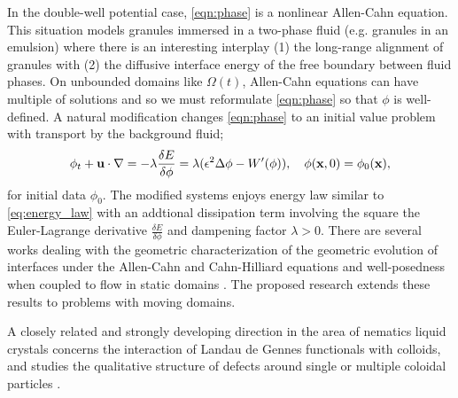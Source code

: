 In the double-well potential case, \eqref{eqn:phase}
is a nonlinear Allen-Cahn
equation.
This situation models granules immersed in a two-phase fluid
(e.g. granules in an emulsion) 
where there is an interesting interplay
(1) the long-range alignment of granules with (2) 
the diffusive interface energy of the free boundary
between fluid phases.
On unbounded domains like $\Omega(t)$,
Allen-Cahn equations can have multiple of solutions
\cite{Alama1997StationaryLS,Alikakos2008OnAE,Bronsard1993OnTB,
  Byeon2014SolutionsOH, Byeon2013OnAP, Alessio2005ENTIRESI,
  Trumper2007ExistenceOA} and so we must reformulate
\eqref{eqn:phase} so that $\phi$ is well-defined.
A natural modification changes
\eqref{eqn:phase} to an initial value problem with
transport by the background fluid;
\begin{equation}
  \label{eqn:phase_transport}
  \phi_t + \mathbf{u} \cdot \nabla
  = -\lambda \frac{\delta E}{\delta \phi}
  =  \lambda(\epsilon^2 \Delta \phi - W'(\phi)),
  \quad \phi(\mathbf{x},0) = \phi_0(\mathbf{x}),
\end{equation}
for initial data $\phi_0$.
The modified systems enjoys energy law similar to \eqref{eq:energy_law} 
with an addtional dissipation term involving the square 
the Euler-Lagrange derivative $\frac{\delta E}{\delta \phi}$ and dampening factor $\lambda > 0$.
There are several works dealing with the
geometric characterization of the geometric evolution
of interfaces under the Allen-Cahn and Cahn-Hilliard equations
\cite{Christlieb2019CompetitionAC, Gavish2011CurvatureDF, Dai2019WeakSF,
  Promislow2017ExistenceBA, Dai2015CompetitiveGE, Promislow2012CriticalPO,
  Dai2022GeometricEO, Dai2020MinimizersFT,Dai2013GeometricEO,Promislow2022UndulatedBI} and
well-posedness when coupled to flow in static domains
\cite{Jiang2017TwophaseIF, Liu2012StrongSF, Giorgini2019WellPosednessOA,
Wu2022WellposednessOA, Gal2010AsymptoticBO,
Giorgini2020DiffuseIM,Giorgini2019UniquenessAR}.
The proposed research extends these results to
problems with moving domains.

A closely related and strongly developing direction in
the area of nematics liquid crystals concerns the interaction of
Landau de Gennes functionals with colloids, and studies
the qualitative structure of defects around single or multiple
coloidal particles
\cite{doi:10.1098/rsta.2020.0432, Alama2015MinimizersOT, Alama2021SaturnRD, PhysRevE.96.042702}.

